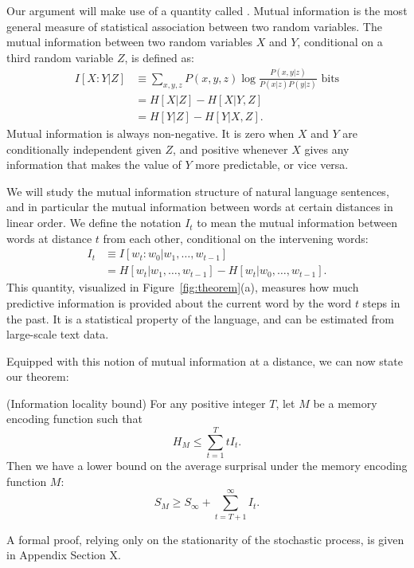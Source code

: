 Our argument will make use of a quantity called . Mutual information is the most general measure of statistical association between two random variables. The mutual information between two random variables $X$ and $Y$, conditional on a third random variable $Z$, is defined as:
\begin{align}
\label{eq:mi}
    I[X:Y|Z] &\equiv \sum_{x,y,z} P(x,y,z) \log \frac{P(x,y|z)}{P(x|z)P(y|z)} \text{ bits} \\
    &= H[X|Z] - H[X|Y,Z] \\
    &= H[Y|Z] - H[Y|X,Z].
\end{align}
Mutual information is always non-negative. It is zero when $X$ and $Y$ are conditionally independent given $Z$, and positive whenever $X$ gives any information that makes the value of $Y$ more predictable, or vice versa. 

We will study the mutual information structure of natural language sentences, and in particular the mutual information between words at certain distances in linear order. We define the notation $I_t$ to mean the mutual information between words at distance $t$ from each other, conditional on the intervening words:
\begin{align}
    I_t &\equiv I[w_t : w_0 | w_1, \dots, w_{t-1}] \\
    &= H[w_t | w_1, \dots, w_{t-1}] - H[w_t | w_0, \dots, w_{t-1}].
\end{align}
This quantity, visualized in Figure~\ref{fig:theorem}(a), measures how much predictive information is provided about the current word by the word $t$ steps in the past.
It is a statistical property of the language, and can be estimated from large-scale text data.

Equipped with this notion of mutual information at a distance, we can now state our theorem:
\begin{thm}\label{prop:suboptimal}(Information locality bound) For any positive integer $T$, let $M$ be a memory encoding function such that
\begin{equation}
\label{eq:memory-bound}
H_M \le \sum_{t=1}^T t I_t.    
\end{equation}
Then we have a lower bound on the average surprisal under the memory encoding function $M$:
\begin{equation}
\label{eq:surprisal-bound}
S_M \ge S_\infty + \sum_{t=T+1}^\infty I_t.
\end{equation}
\end{thm}
A formal proof, relying only on the stationarity of the stochastic process, is given in Appendix Section X. 


